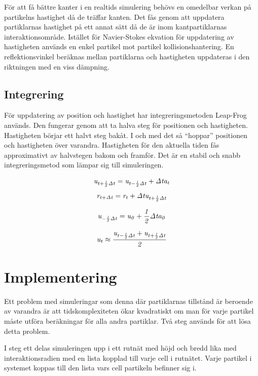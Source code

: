 \documentclass[a4paper,12pt,oneside,final]{extarticle}
\begin{document}
För att få bättre kanter i en realtids simulering behövs en omedelbar verkan på partikelns hastighet då de träffar kanten.
Det fås genom att uppdatera partiklarnas hastighet på ett annat sätt då de är inom kantpartiklarnas interaktionsområde.
Istället för Navier-Stokes ekvation för uppdatering av hastigheten används en enkel partikel mot partikel kollisionshantering.
En reflektionsvinkel beräknas mellan partiklarna och hastigheten uppdateras i den riktningen med en viss dämpning.

\subsection{Integrering}
För uppdatering av position och hastighet har integreringsmetoden Leap-Frog används. Den fungerar genom att ta halva steg för positionen och hastigheten.
Hastigheten börjar ett halvt steg bakåt.
I och med det så “hoppar” positionen och hastigheten över varandra.
Hastigheten för den aktuella tiden fås approximativt av halvstegen bakom och framför.
Det är en stabil och snabb integreringsmetod som lämpar sig till simuleringen.

\begin{equation}
{\it u_{t + \frac{1}{2} \Delta t} = u_{t - \frac{1}{2} \Delta t} + \Delta t a_t}
\end{equation}
\begin{equation}
{\it r_{t+ \Delta t} = r_t + \Delta t u_{t + \frac{1}{2} \Delta t }}
\end{equation}

\begin{equation}
{\it u_{-\frac{1}{2} \Delta t} = u_{0} + \frac{1}{2} \Delta t a_0}
\end{equation}

\begin{equation}
{\it u_t \approx \frac{u_{t - \frac{1}{2} \Delta t} + u_{t + \frac{1}{2} \Delta t} }{2} }
\end{equation}

\clearpage
\section{Implementering}
Ett problem med simuleringar som denna där partiklarnas tillstånd är beroende av varandra är att tidskomplexiteten ökar kvadratiskt om man för varje partikel måste utföra beräkningar för alla andra partiklar.
Två steg används för att lösa detta problem.

I steg ett delas simuleringen upp i ett rutnät med höjd och bredd lika med interaktionsradien med en lista kopplad till varje cell i rutnätet.
Varje partikel i systemet koppas till den lista vars cell partikeln befinner sig i.
\end{document}
